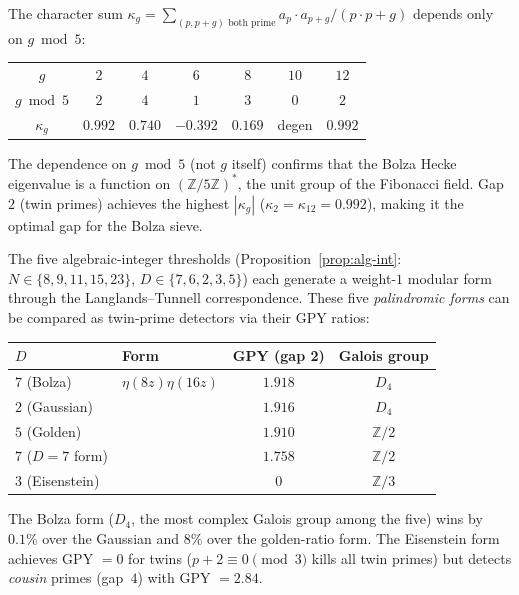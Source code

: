 \begin{remark}
\begin{remark}
\label{rmk:gap-analysis}
The character sum $\kappa_g = \sum_{(p,p{+}g)\text{ both prime}}
a_p \cdot a_{p+g}/(p \cdot p{+}g)$ depends only on $g \bmod 5$:
\begin{center}
\begin{tabular}{ccccccc}
\toprule
$g$ & $2$ & $4$ & $6$ & $8$ & $10$ & $12$ \\
$g \bmod 5$ & $2$ & $4$ & $1$ & $3$ & $0$ & $2$ \\
\midrule
$\kappa_g$ & $0.992$ & $0.740$ & $-0.392$ & $0.169$ & degen & $0.992$ \\
\bottomrule
\end{tabular}
\end{center}
The dependence on $g \bmod 5$ (not $g$ itself) confirms that the
Bolza Hecke eigenvalue is a function on
$(\mathbb{Z}/5\mathbb{Z})^*$, the unit group of the Fibonacci field.
Gap~$2$ (twin primes) achieves the highest $|\kappa_g|$
($\kappa_2 = \kappa_{12} = 0.992$), making it the optimal gap
for the Bolza sieve.
\end{remark}

\begin{remark}
\label{rmk:palindromic-comparison}
The five algebraic-integer thresholds
(Proposition~\ref{prop:alg-int}: $N \in \{8,9,11,15,23\}$,
$D \in \{7,6,2,3,5\}$)
each generate a weight-$1$ modular form through the
Langlands--Tunnell correspondence.
These five \emph{palindromic forms} can be compared as
twin-prime detectors via their GPY ratios:
\begin{center}
\begin{tabular}{llcc}
\toprule
$D$ & Form & GPY (gap 2) & Galois group \\
\midrule
$7$ (Bolza) & $\eta(8z)\eta(16z)$ & $\mathbf{1.918}$ & $D_4$ \\
$2$ (Gaussian) & & $1.916$ & $D_4$ \\
$5$ (Golden) & & $1.910$ & $\mathbb{Z}/2$ \\
$7$ ($D{=}7$ form) & & $1.758$ & $\mathbb{Z}/2$ \\
$3$ (Eisenstein) & & $0$ & $\mathbb{Z}/3$ \\
\bottomrule
\end{tabular}
\end{center}
The Bolza form ($D_4$, the most complex Galois group among the five)
wins by $0.1\%$ over the Gaussian and $8\%$ over the golden-ratio form.
The Eisenstein form achieves GPY $= 0$ for twins ($p + 2 \equiv 0
\pmod{3}$ kills all twin primes) but detects \emph{cousin} primes
(gap~$4$) with GPY $= 2.84$.


\end{remark}
\end{remark}
